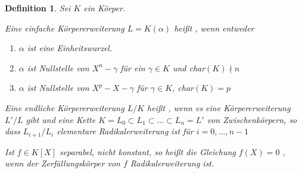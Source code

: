 \documentclass[a4paper,10pt,german]{scrbook}
\theoremstyle{saetze}
\theoremstyle{definitionen}
\newtheorem{Def}{Definition}[section]
\begin{document}
\begin{Def}
Sei $K$ ein Körper.
\begin{enum}

\item Eine einfache Körpererweiterung $L=K(\alpha)$ heißt
, wenn entweder

\begin{enumerate}
\item[(i)] $\alpha$ ist eine Einheitswurzel.
\item[(ii)] $\alpha$ ist Nullstelle von $X^n - \gamma$ für ein
$\gamma \in K$ und char$(K) \nmid n$
\item[(iii)] $\alpha$ ist Nullstelle von $X^p - X - \gamma$ für
$\gamma \in K$, char$(K) = p$
\end{enumerate}

\item Eine endliche Körpererweiterung $L/K$ heißt
, wenn es eine Körpererweiterung $L'/L$ gibt
und eine Kette $K=L_0 \subset L_1 \subset \dots \subset L_n = L'$
von Zwischenkörpern, so dass $L_{i+1}/L_i$ elementare
Radikalerweiterung ist für $i=0,\dots,n-1$

\item Ist $f \in K[X]$ separabel, nicht konstant, so heißt die
Gleichung $f(X) = 0$ , wenn der
Zerfällungskörper von $f$ Radikalerweiterung ist.
\end{enum}

\end{Def}
\end{document}
